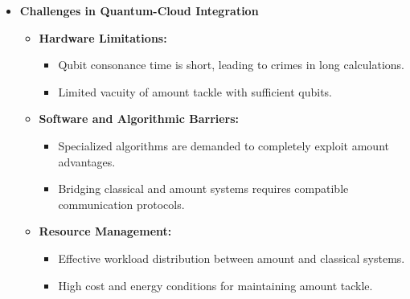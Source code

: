 \documentclass[12pt,a4paper]{article}
\begin{document}
\begin{itemize}
    \item \textbf{Challenges in Quantum-Cloud Integration}
    \begin{itemize}
        \item \textbf{Hardware Limitations:}
        \begin{itemize}
            \item Qubit consonance time is short, leading to crimes in long calculations.
            \item Limited vacuity of amount tackle with sufficient qubits.
        \end{itemize}
        \item \textbf{Software and Algorithmic Barriers:}
        \begin{itemize}
           \item Specialized algorithms are demanded to completely exploit amount advantages.
           \item Bridging classical and amount systems requires compatible communication protocols.
        \end{itemize}
        \item \textbf{Resource Management:}
        \begin{itemize}
           \item Effective workload distribution between amount and classical systems.
           \item High cost and energy conditions for maintaining amount tackle.
        \end{itemize}
    \end{itemize}


\end{itemize}
\end{document}
